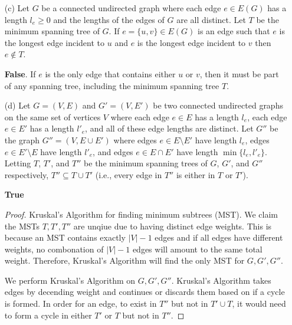 \documentclass[12pt]{article}
\begin{document}
\begin{enumerate}
\begin{proof}
  Note that any spanning tree by definition is connected and acyclic and therefore has exactly $n-1$ edges. Let $T$ be the minimum spanning tree in $G$ with total length $d$. The total length of $f(T) = d + 2(|V|-1)$. 

  By definition of minimum spanning tree, the total length of any other spanning tree, $G'$, is greater than $d$ due to the distinctness of the edge weights and therefore, the legnth of $f(T') > d + 2(|V|-1)$. 
  
  $f(T)$ is the minimum spanning tree in $G'$.
  \end{proof}


\item [(c)] Let $G$ be a connected undirected graph where each edge $e \in E(G)$ has a length $l_e \geq 0$ and the lengths of the edges of $G$ are all distinct. Let $T$ be the minimum spanning tree of $G$. If $e = \{u,v\} \in E(G)$ is an edge such that $e$ is the longest edge incident to $u$ and $e$ is the longest edge incident to $v$ then $e \notin T$.

\textbf{False}. If $e$ is the only edge that contains either $u$ or $v$, then it must be part of any spanning tree, including the minimum spanning tree $T$.

\item [(d)] Let $G = (V,E)$ and $G' = (V,E')$ be two connected undirected graphs on the same set of vertices $V$ where each edge $e \in E$ has a length $l_e$, each edge $e \in E'$ has a length $l'_e$, and all of these edge lengths are distinct. Let $G''$ be the graph $G'' = (V,E \cup E')$ where edges $e \in E \setminus E'$ have length $l_e$, edges $e \in E' \setminus E$ have length $l'_e$, and edges $e \in E \cap E'$ have length $\min{\{l_e,l'_e\}}$. Letting $T$, $T'$, and $T''$ be the minimum spanning trees of $G$, $G'$, and $G''$ respectively, $T'' \subseteq T \cup T'$ (i.e., every edge in $T''$ is either in $T$ or $T'$).

\textbf{True}
\begin{proof}
  Kruskal's Algorithm for finding minimum subtrees (MST). We claim the MSTs $T, T', T''$ are unqiue due to having distinct edge weights. This is because an MST contains exactly $|V| - 1$ edges and if all edges have different weights, no combonation of $|V| - 1$ edges will amount to the same total weight. Therefore, Kruskal's Algorithm will find the only MST for $G, G', G''$.

  We perform Kruskal's Algorithm on $G, G', G''$. Kruskal's Algorithm takes edges by decending weight and continues or discards them based on if a cycle is formed. In order for an edge, to exist in $T''$ but not in $T' \cup T$, it would need to form a cycle in either $T'$ or $T$ but not in $T''$.


\end{proof}
\end{enumerate}
\end{document}
